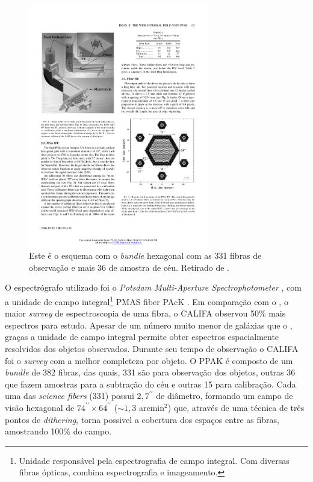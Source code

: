 \begin{figure}
	\includegraphics[width=0.7\textwidth]{figuras/PPAK}
	\caption[Distribuição das fibras no instrumento PMAS/PPAK]
  {Este é o esquema com o {\em bundle} hexagonal com as 331 fibras de observação e mais 36 de amostra de céu. Retirado
  de \citet{Kelz2006}.}
	\label{fig:PPAK}
\end{figure}

O espectrógrafo utilizado foi o {\em Potsdam Multi-Aperture Spectrophotometer} \citep[PMAS;][]{Roth2005, Roth2010}, com a unidade de campo integral\footnote{Unidade responsável pela espectrografia de campo integral. Com diversas fibras ópticas, combina espectrografia e imageamento.} PMAS fiber PAcK \citep[PPAK;][Figura \ref{fig:PPAK}]{Verheijen2004, Kelz2006}. Em comparação com o \SDSS, o maior {\em survey} de espectroscopia de uma fibra, o CALIFA observou 50\% mais espectros para estudo. Apesar de um número muito menor de galáxias que o \SDSS, graças a unidade de campo integral permite obter espectros espacialmente resolvidos dos objetos observados. Durante seu tempo de observação o CALIFA foi o {\em survey} com a melhor completeza por objeto. O PPAK é composto de um {\em bundle} de 382 fibras, das quais, 331 são para observação dos objetos, outras 36 que fazem amostras para a subtração do céu e outras 15 para calibração. Cada uma das {\em science fibers} (331) possui $2,7^{\prime\prime}$ de diâmetro, formando um campo de visão hexagonal de $74^{\prime\prime} \times 64^{\prime\prime}$ ($\sim1,3$ arcmin$^2$) que, através de uma técnica de três pontos de {\em dithering}, torna possivel a cobertura dos espaços entre as fibras, amostrando 100\% do campo.

